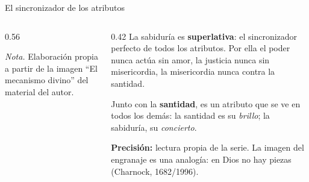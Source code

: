 \documentclass[hyperref={bookmarks=false},aspectratio=169]{beamer}
\newcommand{\heb}[1]{\mbox{\foreignlanguage{hebrew}{#1}}}
\newcommand{\destacar}[1]{\textbf{\textcolor{azul}{#1}}}
\newcommand{\precision}[1]{{\footnotesize\color{gris}\textbf{Precisión:} #1}}
\newcommand{\gear}[4]{\fill[#4] #1 circle (#2);
  \foreach \k in {1,...,#3}{\pgfmathsetmacro{\a}{360/#3*\k}
    \fill[#4,rotate around={\a:#1}] ($#1+(-0.09,#2-0.02)$) rectangle ($#1+(0.09,#2+0.16)$);}}
\begin{document}
\begin{frame}{El sincronizador de los atributos}
\begin{columns}[c,onlytextwidth]
\begin{column}{0.56\textwidth}
\centering
{}\par\vspace{1pt}
{\fontsize{5}{6}\selectfont\color{gris}\textit{Nota.} Elaboración propia a partir de la imagen ``El mecanismo divino'' del material del autor.\par}
\end{column}
\begin{column}{0.42\textwidth}\small
La sabiduría es \destacar{superlativa}: el sincronizador perfecto de todos los atributos. Por ella el poder nunca actúa sin amor, la justicia nunca sin misericordia, la misericordia nunca contra la santidad.\par\medskip
Junto con la \destacar{santidad}, es un atributo que se ve en todos los demás: la santidad es su \emph{brillo}; la sabiduría, su \emph{concierto}.\par\medskip
\precision{lectura propia de la serie. La imagen del engranaje es una analogía: en Dios no hay piezas (Charnock, 1682/1996).}
\end{column}
\end{columns}
\end{frame}
\end{document}

